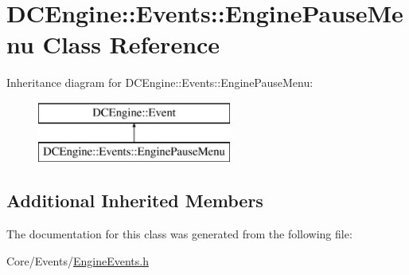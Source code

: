 \hypertarget{classDCEngine_1_1Events_1_1EnginePauseMenu}{\section{D\-C\-Engine\-:\-:Events\-:\-:Engine\-Pause\-Menu Class Reference}
\label{classDCEngine_1_1Events_1_1EnginePauseMenu}
}
Inheritance diagram for D\-C\-Engine\-:\-:Events\-:\-:Engine\-Pause\-Menu\-:\begin{figure}[H]
\begin{center}
\leavevmode
\includegraphics[height=2.000000cm]{classDCEngine_1_1Events_1_1EnginePauseMenu}
\end{center}
\end{figure}
\subsection*{Additional Inherited Members}


The documentation for this class was generated from the following file\-:\begin{DoxyCompactItemize}
\item 
Core/\-Events/\hyperlink{EngineEvents_8h}{Engine\-Events.\-h}\end{DoxyCompactItemize}
